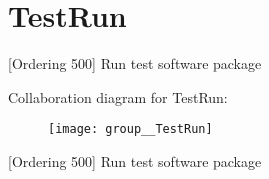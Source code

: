 \hypertarget{group__TestRun}{\section{Test\-Run}
\label{group__TestRun}
}


\mbox{[}Ordering 500\mbox{]} Run test software package  


Collaboration diagram for Test\-Run\-:\nopagebreak
\begin{figure}[H]
\begin{center}
\leavevmode
\texttt{[image: group\_\_TestRun]}
\end{center}
\end{figure}
\mbox{[}Ordering 500\mbox{]} Run test software package 